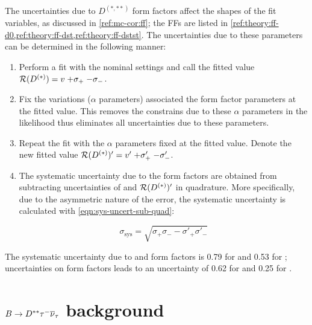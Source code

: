 The uncertainties due to $D^{(*,**)}$ form factors affect the shapes of the fit
variables,
as discussed in \cref{ref:mc-cor:ff};
the FFs are listed in
\cref{ref:theory:ff-d0,ref:theory:ff-dst,ref:theory:ff-dstst}.
The uncertainties due to these parameters can be determined in the following
manner:

\begin{enumerate}
    \item Perform a fit with the nominal settings and call
        the fitted value $\mathcal{R}(D^{(*)}) = v\;{+\sigma_+}\;{-\sigma_-}$.
    \item Fix the variations ($\alpha$ parameters) associated the form factor
        parameters at the fitted value.
        This removes the constrains due to these $\alpha$ parameters in the
        likelihood thus
        eliminates all uncertainties due to these parameters.
    \item Repeat the fit with the $\alpha$ parameters fixed at the fitted
        value.
        Denote the new fitted value
        $\mathcal{R}(D^{(*)})' = v'\;{+\sigma'_+}\;{-\sigma'_-}$.
    \item The systematic uncertainty due to the form factors are
        obtained from subtracting uncertainties of \RDX and $\mathcal{R}(D^{(*)})'$ in
        quadrature.
        More specifically, due to the asymmetric nature of the error,
        the systematic uncertainty is calculated with
        \cref{eqn:sys-uncert-sub-quad}:

        \begin{equation}
            \sigma_\text{sys} = \sqrt{\sigma_+ \sigma_- - \sigma'_+ \sigma'_-}
            \label{eqn:sys-uncert-sub-quad}
        \end{equation}
\end{enumerate}


The systematic uncertainty due to \Dz and \Dstar form factors is 0.79 for
\RD and 0.53 for \RDst;
uncertainties on \Dstst form factors leads to an uncertainty of 0.62 for \RD and
0.25 for \RDst.


\section{$B \rightarrow D^{**}{\tau^-}{{\overline{\nu}}_\tau}$ background}
\label{sys-tau-dstst}


